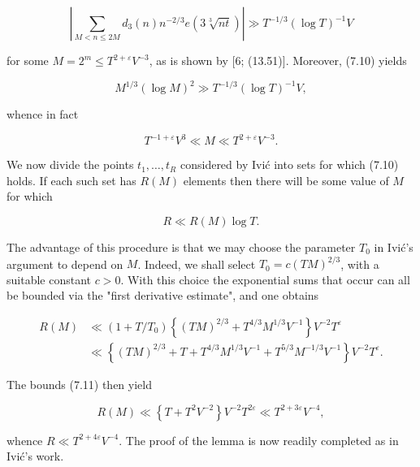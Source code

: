 \documentclass[10pt]{article}
\begin{document}
\begin{equation*}
\left|\sum_{M<n \leq 2 M} d_{3}(n) n^{-2 / 3} e(3 \sqrt[3]{n t})\right| \gg T^{-1 / 3}(\log T)^{-1} V \tag{7.10}
\end{equation*}


for some $M=2^{m} \leq T^{2+\varepsilon} V^{-3}$, as is shown by [6; (13.51)]. Moreover, (7.10) yields

$$
M^{1 / 3}(\log M)^{2} \gg T^{-1 / 3}(\log T)^{-1} V,
$$

whence in fact


\begin{equation*}
T^{-1+\varepsilon} V^{3} \ll M \ll T^{2+\varepsilon} V^{-3}. \tag{7.11}
\end{equation*}


We now divide the points $t_{1}, \ldots, t_{R}$ considered by Ivić into sets for which (7.10) holds. If each such set has $R(M)$ elements then there will be some value of $M$ for which

$$
R \ll R(M) \log T .
$$

The advantage of this procedure is that we may choose the parameter $T_{0}$ in Ivić's argument to depend on $M$. Indeed, we shall select $T_{0}=c(T M)^{2 / 3}$, with a suitable constant $c>0$. With this choice the exponential sums that occur can all be bounded via the "first derivative estimate", and one obtains

$$
\begin{aligned}
R(M) & \ll\left(1+T / T_{0}\right)\left\{(T M)^{2 / 3}+T^{4 / 3} M^{1 / 3} V^{-1}\right\} V^{-2} T^{\varepsilon} \\
& \ll\left\{(T M)^{2 / 3}+T+T^{4 / 3} M^{1 / 3} V^{-1}+T^{5 / 3} M^{-1 / 3} V^{-1}\right\} V^{-2} T^{\varepsilon} .
\end{aligned}
$$

The bounds (7.11) then yield

$$
R(M) \ll\left\{T+T^{2} V^{-2}\right\} V^{-2} T^{2 \varepsilon} \ll T^{2+3 \varepsilon} V^{-4},
$$

whence $R \ll T^{2+4 \varepsilon} V^{-4}$. The proof of the lemma is now readily completed as in Ivić's work.
\end{document}
